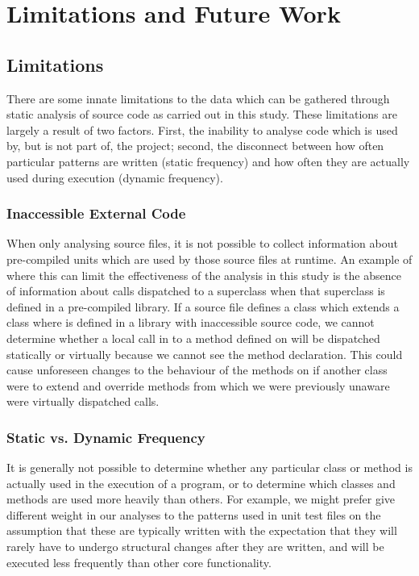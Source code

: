 \chapter{Limitations and Future Work}\label{C:future}

\section{Limitations}
There are some innate limitations to the data which can be gathered through static analysis of source code as carried out in this study. These limitations are largely a result of two factors. First, the inability to analyse code which is used by, but is not part of, the project; second, the disconnect between how often particular patterns are written (static frequency) and how often they are actually used during execution (dynamic frequency).

\subsection{Inaccessible External Code}
When only analysing source files, it is not possible to collect information about pre-compiled units which are used by those source files at runtime. An example of where this can limit the effectiveness of the analysis in this study is the absence of information about calls dispatched to a superclass when that superclass is defined in a pre-compiled library. If a source file defines a class  which extends a class  where  is defined in a library with inaccessible source code, we cannot determine whether a local call in  to a method defined on  will be dispatched statically or virtually because we cannot see the method declaration. This could cause unforeseen changes to the behaviour of the methods on  if another class  were to extend  and override methods from  which we were previously unaware were virtually dispatched calls.

\subsection{Static vs. Dynamic Frequency}
It is generally not possible to determine whether any particular class or method is actually used in the execution of a program, or to determine which classes and methods are used more heavily than others. For example, we might prefer give different weight in our analyses to the patterns used in unit test files on the assumption that these are typically written with the expectation that they will rarely have to undergo structural changes after they are written, and will be executed less frequently than other core functionality.


